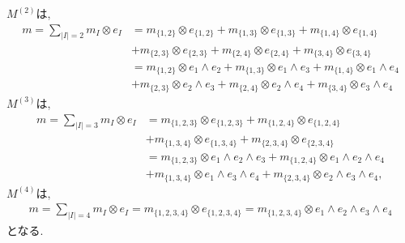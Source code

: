 \documentclass[11pt, a4paper, dvipdfmx]{jsarticle}
\theoremstyle{definition}
\numberwithin{equation}{section}
\begin{document}
$M^{(2)}$は, \begin{align*}
        m = \sum_{|I|=2}m_I\otimes e_I 
        &= m_{\{1,2\}}\otimes e_{\{1,2\}}
        +  m_{\{1,3\}}\otimes e_{\{1,3\}}
        +  m_{\{1,4\}}\otimes e_{\{1,4\}}\\
        &+ m_{\{2,3\}}\otimes e_{\{2,3\}}
        +  m_{\{2,4\}}\otimes e_{\{2,4\}}
        +  m_{\{3,4\}}\otimes e_{\{3,4\}}\\
        &= m_{\{1,2\}}\otimes e_1\wedge e_2
        +  m_{\{1,3\}}\otimes e_1\wedge e_3
        +  m_{\{1,4\}}\otimes e_1\wedge e_4\\
        &+  m_{\{2,3\}}\otimes e_2\wedge e_3
        +  m_{\{2,4\}}\otimes e_2\wedge e_4
        +  m_{\{3,4\}}\otimes e_3\wedge e_4
    \end{align*}
$M^{(3)}$は, 
    \begin{align*}
        m = \sum_{|I|=3}m_I\otimes e_I
        &= m_{\{1,2,3\}}\otimes e_{\{1,2,3\}}
        + m_{\{1,2,4\}}\otimes e_{\{1,2,4\}}\\
        &+ m_{\{1,3,4\}}\otimes e_{\{1,3,4\}}
        + m_{\{2,3,4\}}\otimes e_{\{2,3,4\}}\\
        &= m_{\{1,2,3\}}\otimes e_1\wedge e_2\wedge e_3
        +  m_{\{1,2,4\}}\otimes e_1\wedge e_2\wedge e_4\\
        &+ m_{\{1,3,4\}}\otimes e_1\wedge e_3\wedge e_4
        +  m_{\{2,3,4\}}\otimes e_2\wedge e_3\wedge e_4,
    \end{align*}
$M^{(4)}$は, 
    \begin{align*}
        m = \sum_{|I|=4}m_I\otimes e_I 
        = m_{\{1,2,3,4\}}\otimes e_{\{1,2,3,4\}}
        = m_{\{1,2,3,4\}}\otimes e_1\wedge e_2\wedge e_3\wedge e_4
    \end{align*}
となる. 
\end{document}
